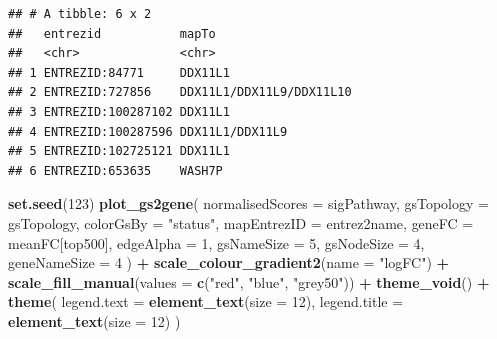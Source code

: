 \documentclass[9pt,a4paper,]{extarticle}
\newenvironment{Shaded}{\begin{snugshade}}{\end{snugshade}}
\newcommand{\AttributeTok}[1]{\textcolor[rgb]{0.13,0.29,0.53}{#1}}
\newcommand{\DecValTok}[1]{\textcolor[rgb]{0.00,0.00,0.81}{#1}}
\newcommand{\FunctionTok}[1]{\textcolor[rgb]{0.13,0.29,0.53}{\textbf{#1}}}
\newcommand{\NormalTok}[1]{#1}
\newcommand{\SpecialCharTok}[1]{\textcolor[rgb]{0.81,0.36,0.00}{\textbf{#1}}}
\newcommand{\StringTok}[1]{\textcolor[rgb]{0.31,0.60,0.02}{#1}}
\begin{document}
\begin{verbatim}
## # A tibble: 6 x 2
##   entrezid           mapTo                   
##   <chr>              <chr>                   
## 1 ENTREZID:84771     DDX11L1                 
## 2 ENTREZID:727856    DDX11L1/DDX11L9/DDX11L10
## 3 ENTREZID:100287102 DDX11L1                 
## 4 ENTREZID:100287596 DDX11L1/DDX11L9         
## 5 ENTREZID:102725121 DDX11L1                 
## 6 ENTREZID:653635    WASH7P
\end{verbatim}

\begin{Shaded}
\begin{Highlighting}[]
\FunctionTok{set.seed}\NormalTok{(}\DecValTok{123}\NormalTok{)}
\FunctionTok{plot\_gs2gene}\NormalTok{(}
    \AttributeTok{normalisedScores =}\NormalTok{ sigPathway, }
    \AttributeTok{gsTopology =}\NormalTok{ gsTopology, }
    \AttributeTok{colorGsBy =} \StringTok{"status"}\NormalTok{, }
    \AttributeTok{mapEntrezID =}\NormalTok{ entrez2name, }
    \AttributeTok{geneFC =}\NormalTok{ meanFC[top500], }
    \AttributeTok{edgeAlpha =} \DecValTok{1}\NormalTok{, }
    \AttributeTok{gsNameSize =} \DecValTok{5}\NormalTok{, }
    \AttributeTok{gsNodeSize =} \DecValTok{4}\NormalTok{,}
    \AttributeTok{geneNameSize =} \DecValTok{4}
\NormalTok{) }\SpecialCharTok{+}
    \FunctionTok{scale\_colour\_gradient2}\NormalTok{(}\AttributeTok{name =} \StringTok{"logFC"}\NormalTok{) }\SpecialCharTok{+}
    \FunctionTok{scale\_fill\_manual}\NormalTok{(}\AttributeTok{values =} \FunctionTok{c}\NormalTok{(}\StringTok{"red"}\NormalTok{, }\StringTok{"blue"}\NormalTok{, }\StringTok{"grey50"}\NormalTok{)) }\SpecialCharTok{+}
    \FunctionTok{theme\_void}\NormalTok{() }\SpecialCharTok{+}
    \FunctionTok{theme}\NormalTok{(}
        \AttributeTok{legend.text =} \FunctionTok{element\_text}\NormalTok{(}\AttributeTok{size =} \DecValTok{12}\NormalTok{),}
        \AttributeTok{legend.title =} \FunctionTok{element\_text}\NormalTok{(}\AttributeTok{size =} \DecValTok{12}\NormalTok{)}
\NormalTok{    )}
\end{Highlighting}
\end{Shaded}
\end{document}
